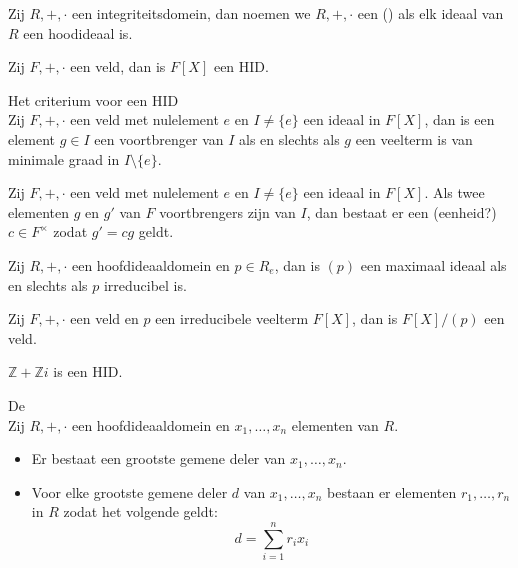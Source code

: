\documentclass[main.tex]{subfiles}
\begin{document}
\begin{de}
  Zij $R,+,\cdot$ een integriteitsdomein, dan noemen we $R,+,\cdot$ een  () als elk ideaal van $R$ een hoodideaal is.
\end{de}

\begin{st}
  Zij $F,+,\cdot$ een veld, dan is $F[X]$ een HID.
\end{st}

\begin{st}
  Het criterium voor een HID\\
  Zij $F,+,\cdot$ een veld met nulelement $e$ en $I \neq \{e\}$ een ideaal in $F[X]$, dan is een element $g\in I$ een voortbrenger van $I$ als en slechts als $g$ een veelterm is van minimale graad in $I\setminus \{ e \}$.
\end{st}

\begin{st}
  Zij $F,+,\cdot$ een veld met nulelement $e$ en $I \neq \{e\}$ een ideaal in $F[X]$.
  Als twee elementen $g$ en $g'$ van $F$ voortbrengers zijn van $I$, dan bestaat er een (eenheid?) $c\in F^{\times}$ zodat $g'=cg$ geldt.
\end{st}

\begin{st}
  Zij $R,+,\cdot$ een hoofdideaaldomein en $p\in R_{e}$, dan is $(p)$ een maximaal ideaal als en slechts als $p$ irreducibel is.
\end{st}

\begin{gev}
  Zij $F,+,\cdot$ een veld en $p$ een irreducibele veelterm $F[X]$, dan is $F[X]/(p)$ een veld.
\end{gev}


\begin{st}
  $\mathbb{Z} + \mathbb{Z}i$ is een HID.
  \zb
\end{st}

\begin{st}
  De \\
  Zij $R,+,\cdot$ een hoofdideaaldomein en $x_{1},\dotsc,x_{n}$ elementen van $R$.
  \begin{itemize}
  \item Er bestaat een grootste gemene deler van $x_{1},\dotsc,x_{n}$.
  \item Voor elke grootste gemene deler $d$ van $x_{1},\dotsc,x_{n}$ bestaan er elementen $r_{1},\dotsc,r_{n}$ in $R$ zodat het volgende geldt:
    \[ d = \sum_{i=1}^{n}r_{i}x_{i} \]
  \end{itemize}
\end{st}
\end{document}

